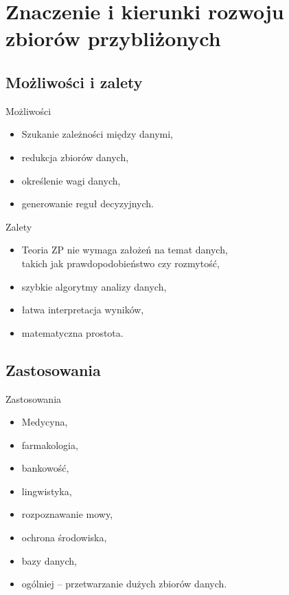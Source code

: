 \documentclass[10pt]{beamer}
\begin{document}
\section{Znaczenie i kierunki rozwoju zbiorów przybliżonych}
\subsection{Możliwości i zalety}
\begin{frame}{Możliwości}
\begin{spacing}{1.5}
\begin{itemize}
\item Szukanie zależności między danymi,
\item redukcja zbiorów danych,
\item określenie wagi danych,
\item generowanie reguł decyzyjnych.
\end{itemize}
\end{spacing}
\end{frame}



\begin{frame}{Zalety}
\begin{spacing}{1.5}
\begin{itemize}
\item Teoria ZP nie wymaga założeń na temat danych,\\takich jak prawdopodobieństwo czy rozmytość,
\item szybkie algorytmy analizy danych,
\item łatwa interpretacja wyników,
\item matematyczna prostota.
\end{itemize}
\end{spacing}
\end{frame}



\subsection{Zastosowania}
\begin{frame}{Zastosowania}
\begin{spacing}{1.5}
\begin{itemize}
\item Medycyna,
\item farmakologia,
\item bankowość,
\item lingwistyka,
\item rozpoznawanie mowy,
\item ochrona środowiska,
\item bazy danych,
\item ogólniej -- przetwarzanie dużych zbiorów danych.
\end{itemize}
\end{spacing}
\end{frame}
\end{document}
